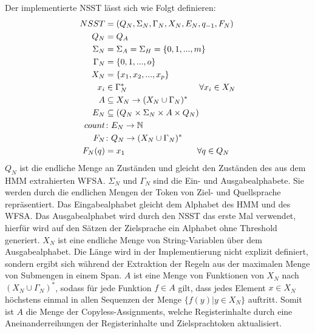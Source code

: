 \documentclass[conference]{IEEEtran}
\begin{document}
Der implementierte NSST lässt sich wie Folgt definieren:
\begin{equation}\notag
    \begin{aligned}
        NSST &= (Q_N, \Sigma_N, \Gamma_N,X_N, E_N, q_{-1}, F_N) \\
        Q_N &= Q_A \\
        \Sigma_N &= \Sigma_A = \Sigma_H = \{0,1,..., m\} \\
        \Gamma_N &= \{0,1,..., o\} \\
        X_N &= \{x_1, x_2, ..., x_p\} \\
        x_i &\in \Gamma_N^* \hspace{3cm} \forall x_i \in X_N\\
        A &\subseteq X_N \rightarrow (X_N \cup \Gamma_N)^*\\
        E_N &\subseteq (Q_N \times \Sigma_N \times A \times Q_N) \\
        count &\colon E_N \rightarrow \mathbb{N}\\
        F_N &\colon Q_N \rightarrow (X_N \cup \Gamma_N)^*\\
        F_N(q) &= x_1  \hspace{3cm} \forall q \in Q_N\\
    \end{aligned}
\end{equation}
$Q_N$ ist die endliche Menge an Zuständen und gleicht den Zuständen des aus dem HMM extrahierten WFSA.
$\Sigma_N$ und $\Gamma_N$ sind die Ein- und Ausgabealphabete. 
Sie werden durch die endlichen Mengen der Token von Ziel- und Quellsprache repräsentiert. Das Eingabealphabet gleicht dem Alphabet des HMM und des WFSA. 
Das Ausgabealphabet wird durch den NSST das erste Mal verwendet, hierfür wird auf den Sätzen der Zielsprache ein Alphabet ohne Threshold generiert.
$X_N$ ist eine endliche Menge von String-Variablen über dem Ausgabealphabet.
Die Länge wird in der Implementierung nicht explizit definiert, sondern ergibt sich während der Extraktion der Regeln aus der maximalen Menge von Submengen in einem Span.
$A$ ist eine Menge von Funktionen von $X_N$ nach $(X_N \cup \Gamma_N)^*$, sodass für jede Funktion $f \in A$ gilt, dass jedes Element $x \in X_N$ höchstens einmal in allen Sequenzen der Menge $\{f(y) | y \in X_N\}$ auftritt.
Somit ist $A$ die Menge der Copyless-Assignments, welche Registerinhalte durch eine Aneinanderreihungen der Registerinhalte und Zielsprachtoken aktualisiert.
\end{document}
